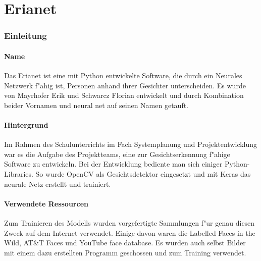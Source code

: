 \documentclass[12pt]{article}
\begin{document}
\tableofcontents
\newpage

\part{Erianet}
\section{Einleitung}
\subsection{Name}
Das Erianet ist eine mit Python entwickelte Software, die
durch ein Neurales Netzwerk f"ahig ist,
Personen anhand ihrer Gesichter unterscheiden.
Es wurde von Mayrhofer Erik und Schwarcz Florian
entwickelt und durch Kombination beider Vornamen und {\glqq} neural net{\grqq}
auf seinen Namen getauft.
\subsection{Hintergrund}
Im Rahmen des Schulunterrichts im Fach {\glqq} Systemplanung und Projektentwicklung{\grqq}
war es die Aufgabe des Projektteams, eine zur Gesichtserkennung
f"ahige Software zu entwickeln.
Bei der Entwicklung bediente man sich einiger Python-Libraries.
So wurde OpenCV als Gesichtsdetektor eingesetzt und mit Keras das neurale
Netz erstellt und trainiert.
\subsection{Verwendete Ressourcen}
Zum Trainieren des Modells wurden vorgefertigte Sammlungen f"ur genau diesen
Zweck auf dem Internet verwendet. Einige davon waren die {\glqq} Labelled Faces in the Wild{\grqq},
{\glqq} AT\&T Faces{\grqq} und {\glqq} YouTube face database{\grqq}. Es wurden
auch selbst Bilder mit einem dazu erstellten Programm geschossen und zum Training verwendet.
\newpage
\end{document}
